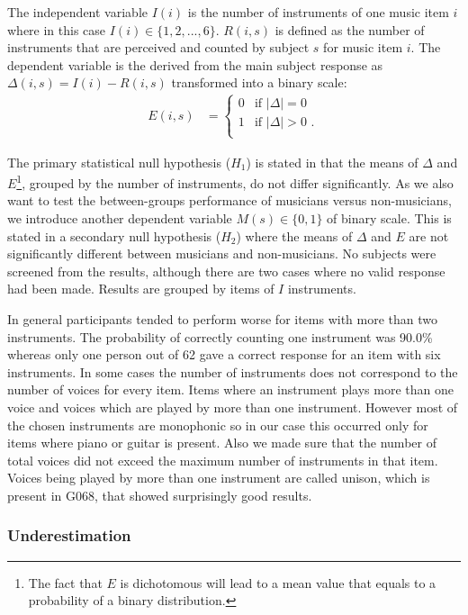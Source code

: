 The independent variable $I(i)$ is the number of instruments of one music item $i$ where in this case $I(i) \in \{1,2,...,6\}$. $R(i,s)$ is defined as the number of instruments that are perceived and counted by subject $s$ for music item $i$. The dependent variable is the derived from the main subject response as $\Delta(i,s) = I(i) - R(i,s)$ transformed into a binary scale:
\begin{align}%
\label{eq:response}
	E(i,s)&=\begin{cases}
		0 & \text{if $|\Delta| = 0 $ } \\
		1 & \text{if $|\Delta| > 0 $ .}\\
	\end{cases}
\end{align}
\par
The primary statistical null hypothesis ($H_1$) is stated in that the means of $\Delta$ and $E$\footnote{The fact that $E$ is dichotomous will lead to a mean value that equals to a probability of a binary distribution.}, grouped by the number of instruments, do not differ significantly. As we also want to test the between-groups performance of musicians versus non-musicians, we introduce another dependent variable $M(s) \in \{0,1\}$ of binary scale. This is stated in a secondary null hypothesis ($H_2$) where the means of $\Delta$ and $E$ are not significantly different between musicians and non-musicians.
No subjects were screened from the results, although there are two cases where no valid response had been made. Results are grouped by items of $I$ instruments.
\par
In general participants tended to perform worse for items with more than two instruments. The probability of correctly counting one instrument was 90.0\% whereas only one person out of 62 gave a correct response for an item with six instruments. In some cases the number of instruments does not correspond to the number of voices for every item. Items where an instrument plays more than one voice and voices which are played by more than one instrument. However most of the chosen instruments are monophonic so in our case this occurred only for items where piano or guitar is present. Also we made sure that the number of total voices did not exceed the maximum number of instruments in that item. Voices being played by more than one instrument are called unison, which is present in G068, that showed surprisingly good results.

\subsubsection*{Underestimation}

